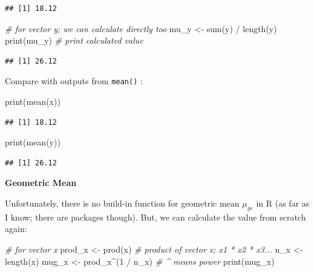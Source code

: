 \documentclass[
]{book}
\newenvironment{Shaded}{\begin{snugshade}}{\end{snugshade}}
\newcommand{\CommentTok}[1]{\textcolor[rgb]{0.56,0.35,0.01}{\textit{#1}}}
\newcommand{\DecValTok}[1]{\textcolor[rgb]{0.00,0.00,0.81}{#1}}
\newcommand{\FunctionTok}[1]{\textcolor[rgb]{0.00,0.00,0.00}{#1}}
\newcommand{\NormalTok}[1]{#1}
\newcommand{\OtherTok}[1]{\textcolor[rgb]{0.56,0.35,0.01}{#1}}
\newcommand{\SpecialCharTok}[1]{\textcolor[rgb]{0.00,0.00,0.00}{#1}}
\begin{document}
\begin{verbatim}
## [1] 18.12
\end{verbatim}

\begin{Shaded}
\begin{Highlighting}[]
\CommentTok{\# for vector y; we can calculate directly too}
\NormalTok{mu\_y }\OtherTok{\textless{}{-}} \FunctionTok{sum}\NormalTok{(y) }\SpecialCharTok{/} \FunctionTok{length}\NormalTok{(y)}
\FunctionTok{print}\NormalTok{(mu\_y) }\CommentTok{\# print calculated value}
\end{Highlighting}
\end{Shaded}

\begin{verbatim}
## [1] 26.12
\end{verbatim}

Compare with outputs from \texttt{mean()} :

\begin{Shaded}
\begin{Highlighting}[]
\FunctionTok{print}\NormalTok{(}\FunctionTok{mean}\NormalTok{(x))}
\end{Highlighting}
\end{Shaded}

\begin{verbatim}
## [1] 18.12
\end{verbatim}

\begin{Shaded}
\begin{Highlighting}[]
\FunctionTok{print}\NormalTok{(}\FunctionTok{mean}\NormalTok{(y))}
\end{Highlighting}
\end{Shaded}

\begin{verbatim}
## [1] 26.12
\end{verbatim}

\textbf{Geometric Mean}

Unfortunately, there is no build-in function for geometric mean \(\mu_{ge}\) in R (as far as I know; there are packages though). But, we can calculate the value from scratch again:

\begin{Shaded}
\begin{Highlighting}[]
\CommentTok{\# for vector x}
\NormalTok{prod\_x }\OtherTok{\textless{}{-}} \FunctionTok{prod}\NormalTok{(x) }\CommentTok{\# product of vector x; x1 * x2 * x3...}
\NormalTok{n\_x }\OtherTok{\textless{}{-}} \FunctionTok{length}\NormalTok{(x)}
\NormalTok{mug\_x }\OtherTok{\textless{}{-}}\NormalTok{ prod\_x}\SpecialCharTok{\^{}}\NormalTok{(}\DecValTok{1} \SpecialCharTok{/}\NormalTok{ n\_x) }\CommentTok{\# \^{} means power}
\FunctionTok{print}\NormalTok{(mug\_x)}
\end{Highlighting}
\end{Shaded}
\end{document}
